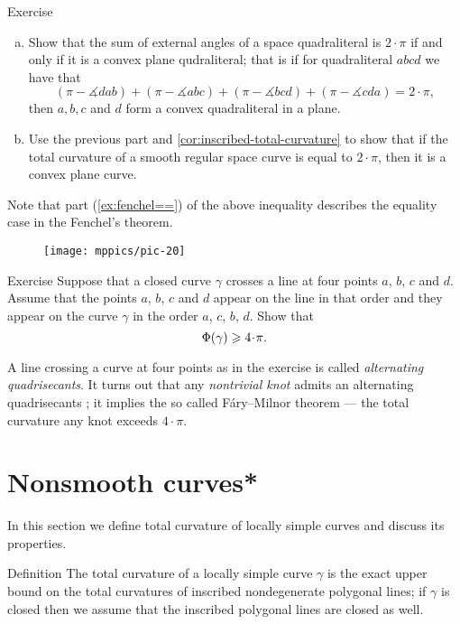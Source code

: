 \begin{thm}{Exercise}\label{ex:fenchel=}
\begin{enumerate}[(a)]
 \item Show that the sum of external angles of a space quadraliteral is $2\cdot\pi$ if and only if it is a convex plane qudraliteral; that is if for quadraliteral $abcd$ we have that 
 \[(\pi-\measuredangle dab)+(\pi-\measuredangle abc)+(\pi-\measuredangle bcd)+(\pi-\measuredangle cda)=2\cdot\pi,\]
 then $a,b,c$ and $d$ form a convex quadraliteral in a plane. 

 \item\label{ex:fenchel==} Use the previous part and \ref{cor:inscribed-total-curvature} to show that if the total curvature of a smooth regular space curve is equal to $2\cdot\pi$, then it is a convex plane curve.
\end{enumerate}
\end{thm}

Note that part (\ref{ex:fenchel==}) of the above inequality describes the equality case in the Fenchel's theorem.

\begin{wrapfigure}{r}{30 mm}
\vskip-0mm
\centering
\texttt{[image: mppics/pic-20]}
\vskip0mm
\end{wrapfigure}

\begin{thm}{Exercise}
Suppose that a closed curve $\gamma$ crosses a line at four points $a$, $b$, $c$ and $d$.
Assume that the points $a$, $b$, $c$ and $d$ appear on the line in that order and they appear on the curve $\gamma$ in the order $a$, $c$, $b$, $d$.
Show that 
\[\tc\gamma\ge 4\cdot\pi.\]

\end{thm}

A line crossing a curve at four points as in the exercise is called \emph{alternating quadrisecants}.
It turns out that any \emph{nontrivial knot} admits an alternating quadrisecants \cite{denne};
it implies the so called F\'ary--Milnor theorem --- the total curvature any knot exceeds $4\cdot \pi$.

\section*{Nonsmooth curves*}

In this section we define total curvature of locally simple curves and discuss its properties.

\begin{thm}{Definition}\label{def:total-curv-poly}
The total curvature of a locally simple curve $\gamma$ is the exact upper bound on the total curvatures of inscribed nondegenerate polygonal lines;
if $\gamma$ is closed then we assume that the inscribed polygonal lines are closed as well.
\end{thm}

